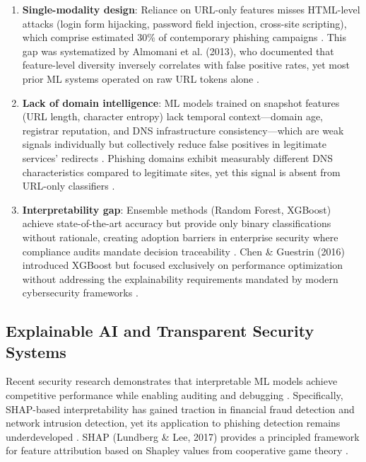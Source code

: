 \documentclass[conference]{IEEEtran}
\begin{document}
\begin{enumerate}
\item \textbf{Single-modality design}: Reliance on URL-only features misses HTML-level attacks (login form hijacking, password field injection, cross-site scripting), which comprise estimated 30\% of contemporary phishing campaigns \cite{b10}. This gap was systematized by Almomani et al. (2013), who documented that feature-level diversity inversely correlates with false positive rates, yet most prior ML systems operated on raw URL tokens alone \cite{b11}.

\item \textbf{Lack of domain intelligence}: ML models trained on snapshot features (URL length, character entropy) lack temporal context—domain age, registrar reputation, and DNS infrastructure consistency—which are weak signals individually but collectively reduce false positives in legitimate services' redirects \cite{b12}. Phishing domains exhibit measurably different DNS characteristics compared to legitimate sites, yet this signal is absent from URL-only classifiers \cite{b13}.

\item \textbf{Interpretability gap}: Ensemble methods (Random Forest, XGBoost) achieve state-of-the-art accuracy but provide only binary classifications without rationale, creating adoption barriers in enterprise security where compliance audits mandate decision traceability \cite{b14}. Chen \& Guestrin (2016) introduced XGBoost but focused exclusively on performance optimization without addressing the explainability requirements mandated by modern cybersecurity frameworks \cite{b15}.
\end{enumerate}

\subsection{Explainable AI and Transparent Security Systems}

Recent security research demonstrates that interpretable ML models achieve competitive performance while enabling auditing and debugging \cite{b17,b18}. Specifically, SHAP-based interpretability has gained traction in financial fraud detection and network intrusion detection, yet its application to phishing detection remains underdeveloped \cite{b19}. SHAP (Lundberg \& Lee, 2017) provides a principled framework for feature attribution based on Shapley values from cooperative game theory \cite{b16}.
\end{document}
